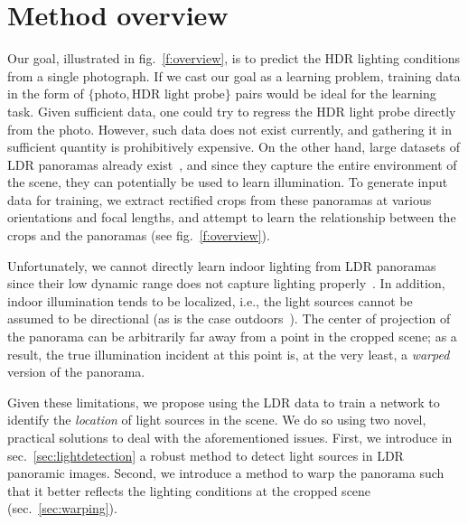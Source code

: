 \section{Method overview}

Our goal, illustrated in fig.~\ref{f:overview}, is to predict the HDR lighting conditions from a single photograph. If we cast our goal as a learning problem, training data in the form of $\{\textrm{photo}, \textrm{HDR light probe}\}$ pairs would be ideal for the learning task. Given sufficient data, one could try to regress the HDR light probe directly from the photo. However, such data does not exist currently, and gathering it in sufficient quantity is prohibitively expensive. On the other hand, large datasets of LDR panoramas already exist~\cite{xiao-cvpr-12}, and since they capture the entire environment of the scene, they can potentially be used to learn illumination. To generate input data for training, we extract rectified crops from these panoramas at various orientations and focal lengths, and attempt to learn the relationship between the crops and the panoramas (see fig.~\ref{f:overview}). 


Unfortunately, we cannot directly learn indoor lighting from LDR panoramas since their low dynamic range does not capture lighting properly~\cite{debevec-siggraph-97}. In addition, indoor illumination tends to be localized, i.e., the light sources cannot be assumed to be directional (as is the case outdoors~\cite{holdgeoffroy-cvpr-17}). The center of projection of the panorama can be arbitrarily far away from a point in the cropped scene; as a result, the true illumination incident at this point is, at the very least, a \emph{warped} version of the panorama. 

Given these limitations, we propose using the LDR data to train a network to identify the \emph{location} of light sources in the scene. We do so using two novel, practical solutions to deal with the aforementioned issues. First, we introduce in sec.~\ref{sec:lightdetection} a robust method to detect light sources in LDR panoramic images. Second, we introduce a method to warp the panorama such that it better reflects the lighting conditions at the cropped scene (sec.~\ref{sec:warping}). %

